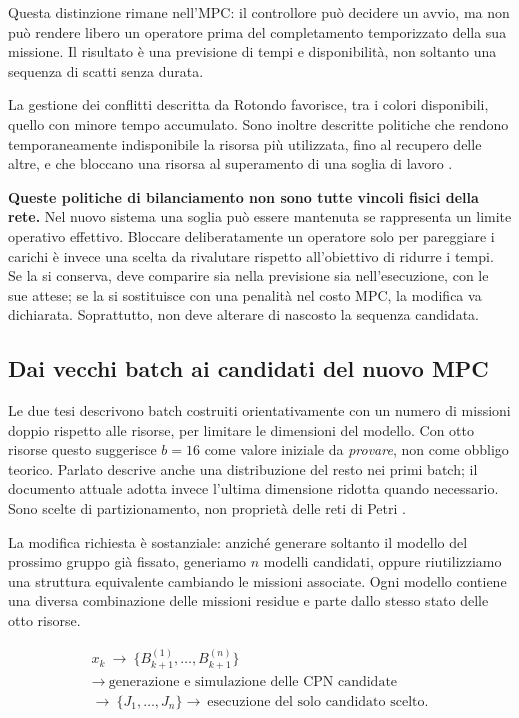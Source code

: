 \documentclass[a4paper,11pt]{article}
\begin{document}
Questa distinzione rimane nell'MPC: il controllore può decidere un avvio, ma non può rendere libero un operatore prima del completamento temporizzato della sua missione. Il risultato è una previsione di tempi e disponibilità, non soltanto una sequenza di scatti senza durata.

La gestione dei conflitti descritta da Rotondo favorisce, tra i colori disponibili, quello con minore tempo accumulato. Sono inoltre descritte politiche che rendono temporaneamente indisponibile la risorsa più utilizzata, fino al recupero delle altre, e che bloccano una risorsa al superamento di una soglia di lavoro \cite[sezioni 2.6.2--2.6.3, pp. 16--20]{Rotondo}.

\textbf{Queste politiche di bilanciamento non sono tutte vincoli fisici della rete.} Nel nuovo sistema una soglia può essere mantenuta se rappresenta un limite operativo effettivo. Bloccare deliberatamente un operatore solo per pareggiare i carichi è invece una scelta da rivalutare rispetto all'obiettivo di ridurre i tempi. Se la si conserva, deve comparire sia nella previsione sia nell'esecuzione, con le sue attese; se la si sostituisce con una penalità nel costo MPC, la modifica va dichiarata. Soprattutto, non deve alterare di nascosto la sequenza candidata.

\subsection{Dai vecchi batch ai candidati del nuovo MPC}

Le due tesi descrivono batch costruiti orientativamente con un numero di missioni doppio rispetto alle risorse, per limitare le dimensioni del modello. Con otto risorse questo suggerisce $b=16$ come valore iniziale da \emph{provare}, non come obbligo teorico. Parlato descrive anche una distribuzione del resto nei primi batch; il documento attuale adotta invece l'ultima dimensione ridotta quando necessario. Sono scelte di partizionamento, non proprietà delle reti di Petri \cite[sezione 2.3.1]{Parlato}\cite[sezione 2.6.3]{Rotondo}.

La modifica richiesta è sostanziale: anziché generare soltanto il modello del prossimo gruppo già fissato, generiamo $n$ modelli candidati, oppure riutilizziamo una struttura equivalente cambiando le missioni associate. Ogni modello contiene una diversa combinazione delle missioni residue e parte dallo stesso stato delle otto risorse.

\[
\begin{gathered}
 x_k\ \longrightarrow\ \{B_{k+1}^{(1)},\ldots,B_{k+1}^{(n)}\}\\
 \longrightarrow\ \text{generazione e simulazione delle CPN candidate}\\
 \longrightarrow\ \{J_1,\ldots,J_n\}
 \longrightarrow\ \text{esecuzione del solo candidato scelto}.
\end{gathered}
\]
\end{document}
